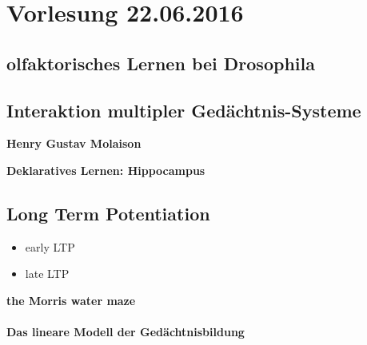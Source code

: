 \section{Vorlesung 22.06.2016}

\subsection{olfaktorisches Lernen bei Drosophila}

\subsection{Interaktion multipler Gedächtnis-Systeme}

\textbf{Henry Gustav Molaison}

\textbf{Deklaratives Lernen: Hippocampus}

\subsection{Long Term Potentiation}

\begin{itemize}
	\item early LTP
	\item late LTP
\end{itemize}

\textbf{the Morris water maze}
\\\\
\textbf{Das lineare Modell der Gedächtnisbildung}